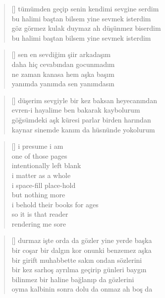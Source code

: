\documentclass[a5paper, openright, twoside]{memoir}
\begin{document}
\begin{verse}[\versewidth]
  tümümden geçip senin kendimi sevgine serdim \\
  bu halimi baştan bilsem yine sevmek isterdim \\
  göz görmez kulak duymaz ah düşünmez biserdim \\
  bu halimi baştan bilsem yine sevmek isterdim \\
\end{verse}
\begin{verse}[\versewidth]
  sen en sevdiğim şiir arkadaşım \\
  daha hiç cevabından gocunmadım \\
  ne zaman kanasa hem aşka başım \\
  yanımda yanımda sen yanımdasın \\
\end{verse}
\begin{verse}[\versewidth]
  düşerim sevgiyle bir kez baksan heyecanından \\
  evren-i hayalime ben bakarak kaybolurum \\
  göğsümdeki aşk küresi parlar birden harından \\
  kaynar sinemde kanım da hüsnünde yokolurum \\
\end{verse}
\begin{verse}[\versewidth]
  i presume i am \\
  one of those pages \\
  intentionally left blank \\
  i matter as a whole \\
  i space-fill place-hold \\
  but nothing more \\
  i behold their books for ages \\
  so it is that reader \\
  rendering me sore \\
\end{verse}
\begin{verse}[\versewidth]
  durmaz işte orda da gözler yine yerde başka \\
  bir coşar bir dalgın kor onunki benzemez aşka \\
  bir girift muhabbette sakın ondan sözlerini \\
  bir kez sarhoş ayrılma geçirip günleri baygın \\
  bilinmez bir haline bağlanıp da gözlerini \\
  oyma kalbinin sonra dolu da onmaz ah boş da \\
\end{verse}
\end{document}
